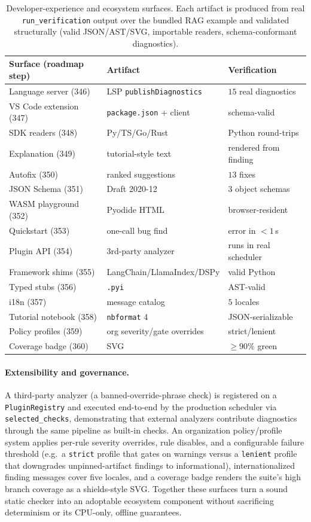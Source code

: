 \documentclass[10pt]{article}
\begin{document}
\begin{table}[t]
\centering
\small
\begin{tabular}{lll}
\toprule
Surface (roadmap step) & Artifact & Verification \\
\midrule
Language server (346) & LSP \texttt{publishDiagnostics} & $15$ real diagnostics \\
VS Code extension (347) & \texttt{package.json} + client & schema-valid \\
SDK readers (348) & Py/TS/Go/Rust & Python round-trips \\
Explanation (349) & tutorial-style text & rendered from finding \\
Autofix (350) & ranked suggestions & $13$ fixes \\
JSON Schema (351) & Draft 2020-12 & $3$ object schemas \\
WASM playground (352) & Pyodide HTML & browser-resident \\
Quickstart (353) & one-call bug find & error in $<\!1$\,s \\
Plugin API (354) & 3rd-party analyzer & runs in real scheduler \\
Framework shims (355) & LangChain/LlamaIndex/DSPy & valid Python \\
Typed stubs (356) & \texttt{.pyi} & AST-valid \\
i18n (357) & message catalog & $5$ locales \\
Tutorial notebook (358) & \texttt{nbformat} 4 & JSON-serializable \\
Policy profiles (359) & org severity/gate overrides & strict/lenient \\
Coverage badge (360) & SVG & $\geq\!90\%$ green \\
\bottomrule
\end{tabular}
\caption{Developer-experience and ecosystem surfaces. Each artifact is produced
from real \texttt{run\_verification} output over the bundled RAG example and
validated structurally (valid JSON/AST/SVG, importable readers, schema-conformant
diagnostics).}
\label{tab:devex}
\end{table}

\paragraph{Extensibility and governance.}
A third-party analyzer (a banned-override-phrase check) is registered on a
\texttt{PluginRegistry} and executed end-to-end by the production scheduler via
\texttt{selected\_checks}, demonstrating that external analyzers contribute
diagnostics through the same pipeline as built-in checks. An organization
policy/profile system applies per-rule severity overrides, rule disables, and a
configurable failure threshold (e.g.\ a \texttt{strict} profile that gates on
warnings versus a \texttt{lenient} profile that downgrades unpinned-artifact
findings to informational), internationalized finding messages cover five
locales, and a coverage badge renders the suite's high branch coverage as a
shields-style SVG. Together these surfaces turn a sound static checker into an
adoptable ecosystem component without sacrificing determinism or its CPU-only,
offline guarantees.
\end{document}
